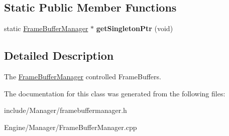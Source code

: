 \subsection*{Static Public Member Functions}
\begin{DoxyCompactItemize}
\item 
\hypertarget{classEngine_1_1FrameBufferManager_afdc0855081d9e9e67954e9401eb00868}{}static \hyperlink{classEngine_1_1FrameBufferManager}{Frame\+Buffer\+Manager} $\ast$ {\bfseries get\+Singleton\+Ptr} (void)\label{classEngine_1_1FrameBufferManager_afdc0855081d9e9e67954e9401eb00868}

\end{DoxyCompactItemize}


\subsection{Detailed Description}
The \hyperlink{classEngine_1_1FrameBufferManager}{Frame\+Buffer\+Manager} controlled Frame\+Buffers. 

The documentation for this class was generated from the following files\+:\begin{DoxyCompactItemize}
\item 
include/\+Manager/framebuffermanager.\+h\item 
Engine/\+Manager/Frame\+Buffer\+Manager.\+cpp\end{DoxyCompactItemize}
